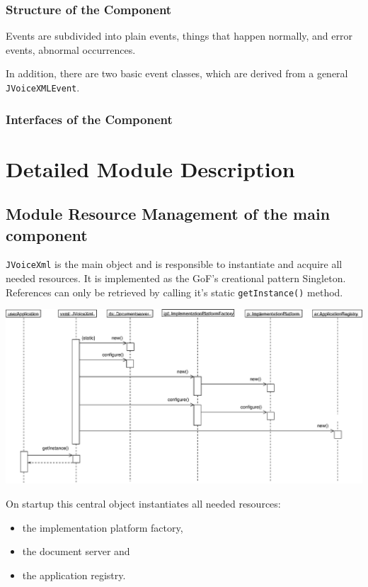 \documentclass[11pt,a4paper]{article}
\begin{document}
\subsubsection{Structure of the Component}

Events are subdivided into plain events, things that happen normally, and
error events, abnormal occurrences.

In addition, there are two basic event classes, which are derived from
a general \texttt{JVoiceXMLEvent}.

\subsubsection{Interfaces of the Component}

\section{Detailed Module Description}
\label{sec:deta-module-descr}

\subsection{Module Resource Management of the main component}

\texttt{JVoiceXml} is the main object and is responsible to instantiate and
acquire all needed resources. It is implemented as the GoF's creational
pattern Singleton\cite{gamma:design_patterns}. References
can only be retrieved by calling it's static \texttt{getInstance()} method.

\begin{center}
\includegraphics[scale=0.4]{seq-jvoicexml-startup.eps}
\end{center}

On startup this central object instantiates all needed resources:

\begin{itemize}
\item the implementation platform factory,
\item the document server and
\item the application registry.
\end{itemize}
\end{document}
